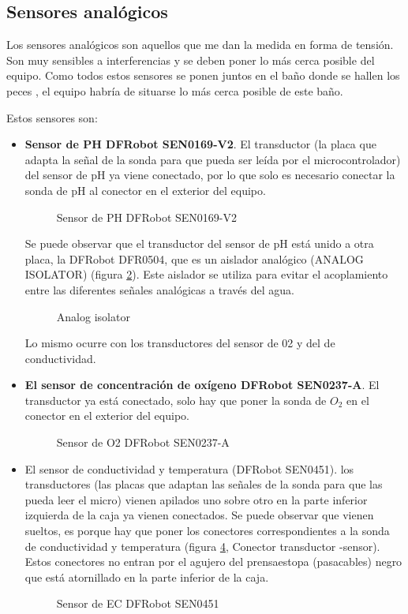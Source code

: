 \subsection{Sensores analógicos}

Los sensores analógicos son aquellos que me dan la medida en forma de tensión. Son muy sensibles a interferencias y se deben poner lo más cerca posible del equipo. Como todos estos sensores se ponen juntos en el baño donde se hallen los peces , el equipo habría de situarse lo más cerca posible de este baño.

Estos sensores son:
\begin{itemize}
\item \textbf{Sensor de PH DFRobot SEN0169-V2}. El transductor (la placa que adapta la señal de la sonda para que pueda ser leída por el microcontrolador) del sensor de pH ya viene conectado, por lo que solo es necesario conectar la sonda de pH al conector en el exterior del equipo.  
\begin{figure}[htbp!] 
\caption{Sensor de PH DFRobot SEN0169-V2}\label{sensor:PH} 
\end{figure}
Se puede observar que el transductor del sensor de pH está unido a otra placa, la DFRobot DFR0504, que es un aislador analógico (ANALOG ISOLATOR) (figura \ref{sensor:iso}). Este aislador se utiliza para evitar el acoplamiento entre las diferentes señales analógicas a través del agua.
\begin{figure}[htbp!] 
\caption{Analog isolator}\label{sensor:iso} 
\end{figure}

Lo mismo ocurre con los transductores del sensor de 02 y del de conductividad.

\item \textbf{El sensor de concentración de oxígeno DFRobot SEN0237-A}. El transductor ya está conectado, solo hay que poner la sonda de $O_2$ en el conector en el exterior del equipo. 
\begin{figure}[htbp!] 
\caption{Sensor de O2 DFRobot SEN0237-A}\label{sensor:O2} 
\end{figure}

\item El sensor de conductividad y temperatura (DFRobot SEN0451). los transductores (las placas que adaptan las señales de la sonda para que las pueda leer el micro) vienen apilados uno sobre otro en la parte inferior izquierda de la caja ya vienen conectados. Se puede observar que vienen sueltos, es porque hay que poner los conectores correspondientes a la sonda de conductividad y temperatura (figura \ref{sensor:EC}, Conector transductor -sensor). Estos conectores no entran por el agujero del prensaestopa (pasacables) negro que está atornillado en la parte inferior de la caja. 
\begin{figure}[htbp!] 
\caption{Sensor de EC DFRobot SEN0451}\label{sensor:EC} 
\end{figure}


\end{itemize}
